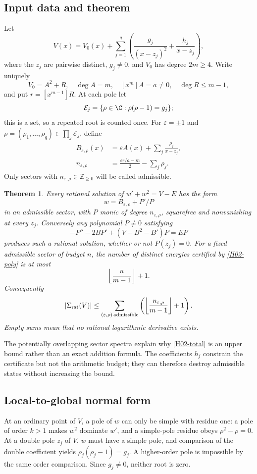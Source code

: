 \documentclass[11pt,a4paper]{article}
\newtheorem{theorem}{Theorem}[section]
\theoremstyle{definition}\newtheorem{definition}[theorem]{Definition}
\theoremstyle{remark}\newtheorem{remark}[theorem]{Remark}
\numberwithin{equation}{section}
\begin{document}
\subsection{Input data and theorem}\label{H02-sec-1}
Let
\[V(x)=V_0(x)+\sum_{j=1}^{q}\left(\frac{g_j}{(x-z_j)^2}+\frac{h_j}{x-z_j}\right),\]
where the $z_j$ are pairwise distinct, $g_j\ne0$, and $V_0$ has degree $2m\ge4$. Write uniquely
\[V_0=A^2+R,\quad\deg A=m,\quad [x^m]A=a\ne0,\quad\deg R\le m-1,\]
and put $r=[x^{m-1}]R$. At each pole let
\[\mathcal E_j=\{\rho\in\C:\rho(\rho-1)=g_j\};\]
this is a set, so a repeated root is counted once. For $\varepsilon=\pm1$ and $\rho=(\rho_1,\ldots,\rho_q)\in\prod_j\mathcal E_j$, define
\begin{align}
B_{\varepsilon,\rho}(x)&=\varepsilon A(x)+\sum_j\frac{\rho_j}{x-z_j},\label{H02-B}\\
n_{\varepsilon,\rho}&=\frac{\varepsilon r/a-m}{2}-\sum_j\rho_j.\label{H02-n}
\end{align}
Only sectors with $n_{\varepsilon,\rho}\in\mathbb Z_{\ge0}$ will be called admissible.
\begin{theorem}\label{H02-count}
Every rational solution of $w'+w^2=V-E$ has the form
\[ w=B_{\varepsilon,\rho}+P'/P \]
in an admissible sector, with $P$ monic of degree $n_{\varepsilon,\rho}$, squarefree and nonvanishing at every $z_j$. Conversely any polynomial $P\ne0$ satisfying
\begin{equation}\label{H02-poly}
-P''-2BP'+(V-B^2-B')P=EP
\end{equation}
produces such a rational solution, whether or not $P(z_j)=0$.
For a fixed admissible sector of budget $n$, the number of distinct energies certified by \eqref{H02-poly} is at most
\[\left\lfloor\frac n{m-1}\right\rfloor+1.\]
Consequently
\begin{equation}\label{H02-total}
|\Sigma_{\rm rat}(V)|\le
\sum_{(\varepsilon,\rho)\,\mathrm{admissible}}
\left(\left\lfloor\frac{n_{\varepsilon,\rho}}{m-1}\right\rfloor+1\right).
\end{equation}
Empty sums mean that no rational logarithmic derivative exists.
\end{theorem}
The potentially overlapping sector spectra explain why \eqref{H02-total} is an upper bound rather than an exact addition formula. The coefficients $h_j$ constrain the certificate but not the arithmetic budget; they can therefore destroy admissible states without increasing the bound.
\subsection{Local-to-global normal form}\label{H02-sec-2}
At an ordinary point of $V$, a pole of $w$ can only be simple with residue one: a pole of order $k>1$ makes $w^2$ dominate $w'$, and a simple-pole residue obeys $\rho^2-\rho=0$. At a double pole $z_j$ of $V$, $w$ must have a simple pole, and comparison of the double coefficient yields $\rho_j(\rho_j-1)=g_j$. A higher-order pole is impossible by the same order comparison. Since $g_j\ne0$, neither root is zero.
\end{document}
